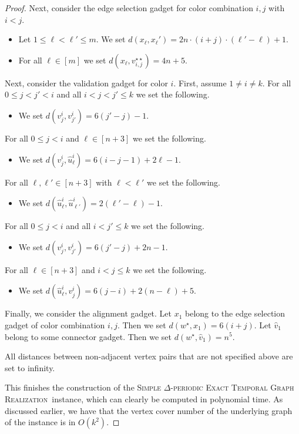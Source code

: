 \documentclass[11pt,a4paper]{article}
\theoremstyle{remark}
\theoremstyle{definition}
\newcommand{\deltaExactLong}{\textsc{Simple $\Delta$-periodic Exact Temporal Graph Realization}}
\begin{document}
\begin{proof}
Next, consider the edge selection gadget for color combination $i,j$ with $i<j$.
\begin{itemize}
    \item Let $1\le \ell<\ell'\le m$. We set $d(x_\ell,x_\ell')=2n\cdot (i+j)\cdot(\ell'-\ell)+1$.
    \item For all $\ell\in[m]$ we set $d(x_\ell,v_{i,j}^{\star\star})=4n+5$.
\end{itemize}

Next, consider the validation gadget for color $i$. First, assume $1\neq i \neq k$. 
%
For all $0\le j<j'<i$ and all $i<j<j'\le k$ we set the following.
\begin{itemize}
    \item We set $d(v^i_j,v^i_{j'})=6(j'-j)-1$.
\end{itemize}
For all $0\le j<i$ and $\ell\in[n+3]$ we set the following.
\begin{itemize}
    \item We set $d(v^i_j,\hat{u}^i_{\ell})=6(i-j-1)+2\ell-1$.
\end{itemize}
For all $\ell,\ell'\in[n+3]$ with $\ell<\ell'$ we set the following.
\begin{itemize}
    \item We set $d(\hat{u}^i_{\ell},\hat{u}^i_{\ell'})=2(\ell'-\ell)-1$.
\end{itemize}
For all $0\le j<i$ and all $i<j'\le k$ we set the following.
\begin{itemize}
    \item We set $d(v^i_j,v^i_{j'})=6(j'-j)+2n-1$.
\end{itemize}
For all $\ell\in[n+3]$ and $i<j\le k$ we set the following.
\begin{itemize}
    \item We set $d(\hat{u}^i_{\ell},v^i_j)=6(j-i)+2(n-\ell)+5$.
\end{itemize}

Finally, we consider the alignment gadget. Let $x_1$ belong to the edge selection gadget of color combination $i,j$. Then we set $d(w^\star,x_1)=6(i+j)$. Let $\hat{v}_1$ belong to some connector gadget. Then we set $d(w^\star,\hat{v}_1)=n^5$.

All distances between non-adjacent vertex pairs that are not specified above are set to infinity.

This finishes the construction of the \deltaExactLong\ instance, which can clearly be computed in polynomial time. As discussed earlier, we have that the vertex cover number of the underlying graph of the instance is in $O(k^2)$.
\end{proof}
\end{document}
